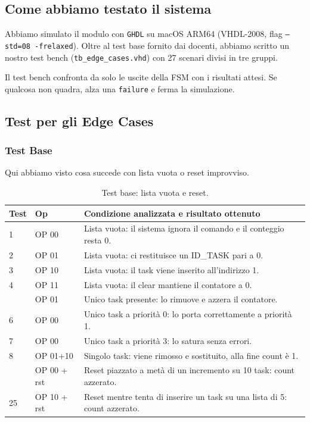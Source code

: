 \documentclass[a4paper,12pt]{article}
\begin{document}
\subsection{Come abbiamo testato il sistema}

Abbiamo simulato il modulo con \texttt{GHDL} su macOS ARM64 (VHDL-2008, flag \texttt{--std=08 -frelaxed}). Oltre al test base fornito dai docenti, abbiamo scritto un nostro test bench (\texttt{tb\_edge\_cases.vhd}) con 27 scenari divisi in tre gruppi.

Il test bench confronta da solo le uscite della FSM con i risultati attesi. Se qualcosa non quadra, alza una \texttt{failure} e ferma la simulazione.

\subsection{Test per gli Edge Cases}

\subsubsection{Test Base}

Qui abbiamo visto cosa succede con lista vuota o reset improvviso.

\begin{table}[H]
\centering
\small
\begin{tabular}{@{}llp{8cm}@{}}
\toprule
\textbf{Test} & \textbf{Op} & \textbf{Condizione analizzata e risultato ottenuto} \\
\midrule
1  & OP 00 & Lista vuota: il sistema ignora il comando e il conteggio resta 0. \\
2  & OP 01 & Lista vuota: ci restituisce un ID\_TASK pari a 0. \\
3  & OP 10 & Lista vuota: il task viene inserito all'indirizzo 1. \\
4  & OP 11 & Lista vuota: il clear mantiene il contatore a 0. \\
\addlinespace
5  & OP 01 & Unico task presente: lo rimuove e azzera il contatore. \\
6  & OP 00 & Unico task a priorità 0: lo porta correttamente a priorità 1. \\
7  & OP 00 & Unico task a priorità 3: lo satura senza errori. \\
8  & OP 01+10 & Singolo task: viene rimosso e sostituito, alla fine count è 1. \\
\addlinespace
24 & OP 00 + rst & Reset piazzato a metà di un incremento su 10 task: count azzerato. \\
25 & OP 10 + rst & Reset mentre tenta di inserire un task su una lista di 5: count azzerato. \\
\bottomrule
\end{tabular}
\caption{Test base: lista vuota e reset.}
\label{tab:test_base}
\end{table}
\end{document}
